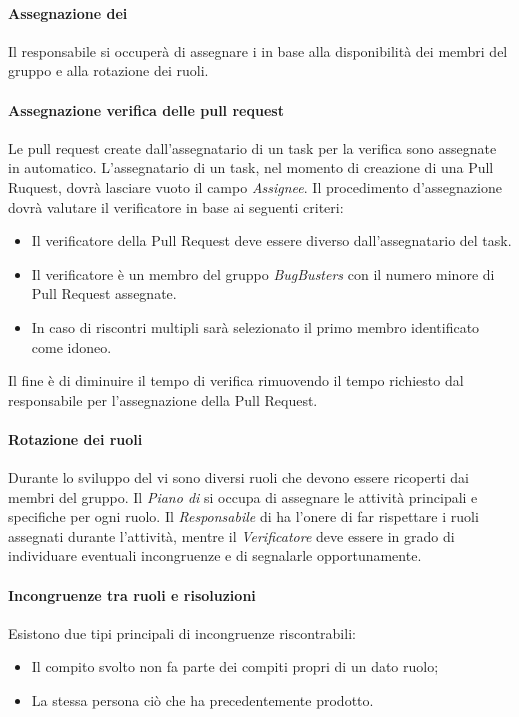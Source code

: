 \paragraph*{Assegnazione dei } Il responsabile si occuperà di assegnare i  in base alla disponibilità dei membri del gruppo e alla rotazione dei ruoli.

\paragraph*{Assegnazione verifica delle pull request} Le pull request create dall'assegnatario di un task per la verifica sono assegnate in automatico. L'assegnatario di un task, nel momento di creazione di una Pull Ruquest, dovrà lasciare vuoto il campo \textit{Assignee}. Il procedimento d'assegnazione dovrà valutare il verificatore in base ai seguenti criteri:
\begin{itemize}
\item Il verificatore della Pull Request deve essere diverso dall'assegnatario del task.
\item Il verificatore è un membro del gruppo \textit{BugBusters} con il numero minore di Pull Request assegnate.
\item In caso di riscontri multipli sarà selezionato il primo membro identificato come idoneo.
\end{itemize}

Il fine \`e di diminuire il tempo di verifica rimuovendo il tempo richiesto dal responsabile per l'assegnazione della Pull Request.

\paragraph*{Rotazione dei ruoli}

Durante lo sviluppo del  vi sono diversi ruoli che devono essere ricoperti dai membri del gruppo. Il \textit{Piano di } si occupa di assegnare le attività principali e specifiche per ogni ruolo. Il \textit{Responsabile} di  ha l'onere di far rispettare i ruoli assegnati durante l'attività, mentre il \textit{Verificatore} deve essere in grado di individuare eventuali incongruenze e di segnalarle opportunamente.
\paragraph*{Incongruenze tra ruoli e risoluzioni}
Esistono due tipi principali di incongruenze riscontrabili:
\begin{itemize}

\item Il compito svolto non fa parte dei compiti propri di un dato ruolo;
\item La stessa persona  ciò che ha precedentemente prodotto.
\end{itemize}

